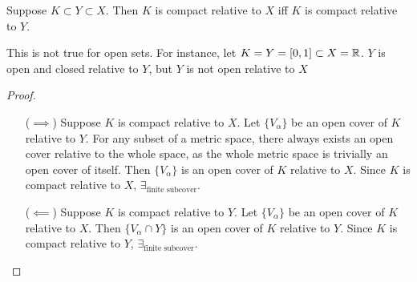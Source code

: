 \begin{theorem}
	Suppose $K \subset Y \subset  X$.
	Then $K$ is compact relative to $X$ iff $K$ is compact relative to $Y$.
	\begin{note}
		This is not true for open sets.
		For instance, let $K=Y=[0,1] \subset X=\mathbb{R} $.
		$Y$ is open and closed relative to $Y$, but $Y$ is not open relative to $X$
	\end{note}
	\begin{proof}\hfill
		\begin{itemize}
			\item [($\implies$)] Suppose $K$ is compact relative to $X$. Let $\{V_{\alpha}\}$ be an open cover of $K$ relative to $Y$. For any subset of a metric space, there always exists an open cover relative to the whole space, as the whole metric space is trivially an open cover of itself.
			      Then $\{V_{\alpha}\}$ is an open cover of $K$ relative to $X$. Since $K$ is compact relative to $X$, $\exists_{\text{finite subcover}}$.
			\item [($\impliedby$)] Suppose $K$ is compact relative to $Y$. Let $\{V_{\alpha}\}$ be an open cover of $K$ relative to $X$.
			      Then $\{V_{\alpha} \cap Y\}$ is an open cover of $K$ relative to $Y$. Since $K$ is compact relative to $Y$, $\exists_{\text{finite subcover}}$.
		\end{itemize}
	\end{proof}
\end{theorem}
